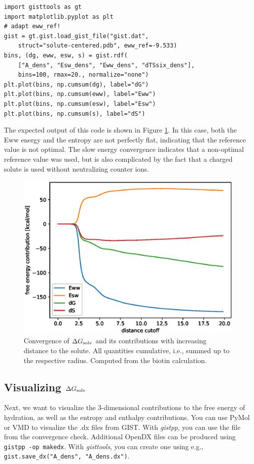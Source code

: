 \documentclass[9pt,tutorial]{livecoms}
\newcommand{\dgsolv}{\Delta G_\textup{solv}}
\newcommand{\software}{\emph}
\newcommand\inlinecode{\texttt}
\begin{document}
\begin{lstlisting}[style=python]
import gisttools as gt
import matplotlib.pyplot as plt
# adapt eww_ref!
gist = gt.gist.load_gist_file("gist.dat",
    struct="solute-centered.pdb", eww_ref=-9.533)
bins, (dg, eww, esw, s) = gist.rdf(
    ["A_dens", "Esw_dens", "Eww_dens", "dTSsix_dens"],
    bins=100, rmax=20., normalize="none")
plt.plot(bins, np.cumsum(dg), label="dG")
plt.plot(bins, np.cumsum(eww), label="Eww")
plt.plot(bins, np.cumsum(esw), label="Esw")
plt.plot(bins, np.cumsum(s), label="dS")
\end{lstlisting}

The expected output of this code is shown in Figure \ref{fig_radial_convergence}.
In this case, both the Eww energy and the entropy are not perfectly flat, indicating that the reference value is not optimal.
The slow energy convergence indicates that a non-optimal reference value was used, but is also complicated by the fact that a charged solute is used without neutralizing counter ions.


\begin{figure}
	\centering
	\includegraphics[width=0.8\linewidth]{figures/A_E_S_convergence.eps}
	\caption{Convergence of $\dgsolv$ and its contributions with increasing distance to the solute. All quantities cumulative, i.e., summed up to the respective radius. Computed from the biotin calculation.}
	\label{fig_radial_convergence}
\end{figure}

\subsection{Visualizing $\dgsolv$}
Next, we want to visualize the 3-dimensional contributions to the free energy of hydration, as well as the entropy and enthalpy contributions.
You can use PyMol\cite{pymol} or VMD\cite{vmd} to visualize the .dx files from GIST.
With \software{gistpp}, you can use the file from the convergence check. Additional OpenDX files can be produced using \inlinecode{gistpp -op makedx}.
With \software{gisttools}, you can create one using e.g., \inlinecode{gist.save\_dx("A\_dens", "A\_dens.dx")}.
\end{document}
